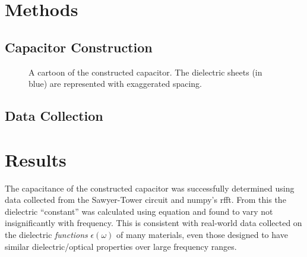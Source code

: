 \documentclass[10pt, twocolumn]{article}
\begin{document}
\section{Methods}
\subsection{Capacitor Construction}
\begin{figure}[h]
    \centering
    \caption{A cartoon of the constructed capacitor. The dielectric sheets (in blue) are represented with exaggerated spacing.}
    \label{illustration:homemade-cap}
\end{figure}
\subsection{Data Collection}
\section{Results}
The capacitance of the constructed capacitor was successfully determined using data collected from the Sawyer-Tower circuit and numpy's rfft.  From this the dielectric ``constant'' was calculated using equation  and found to vary not insignificantly with frequency. This is consistent with real-world data collected on the dielectric \emph{functions} $\epsilon(\omega)$ of many materials, even those designed to have similar dielectric/optical properties over large frequency ranges. 
\end{document}
